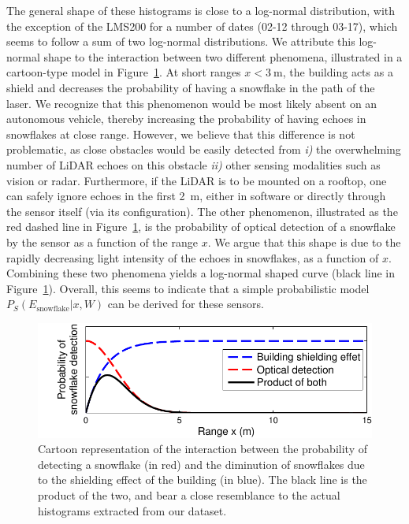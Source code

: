 The general shape of these histograms is close to a log-normal distribution, with the exception of the LMS200 for a number of dates (02-12 through 03-17), which seems to follow a sum of two log-normal distributions. We attribute this log-normal shape to the interaction between two different phenomena, illustrated in a cartoon-type model in Figure~\ref{fig:CartoonModel}. At short ranges $x<\SI{3}{\meter}$, the building acts as a shield and decreases the probability of having a snowflake in the path of the laser. We recognize that this phenomenon would be most likely absent on an autonomous vehicle, thereby increasing the probability of having echoes in snowflakes at close range. However, we believe that this difference is not problematic, as close obstacles would be easily detected from \emph{i)} the overwhelming number of  LiDAR echoes on this obstacle \emph{ii)} other sensing modalities such as vision or radar. Furthermore, if the LiDAR is to be mounted on a rooftop, one can safely  ignore echoes in the first \SI{2}{\meter}, either in software or directly through the sensor itself (via its configuration). The other phenomenon, illustrated as the red dashed line in Figure~\ref{fig:CartoonModel}, is the probability of optical detection of a snowflake by the sensor as a function of the range $x$. We argue that this shape is due to the rapidly decreasing light intensity of the echoes in snowflakes, as a function of $x$. Combining these two phenomena yields a log-normal shaped curve (black line in Figure~\ref{fig:CartoonModel}). Overall, this seems to indicate that a simple probabilistic model $P_S(E_\text{snowflake}|x,W)$ can be derived for these sensors.

\begin{figure}
    \centering
    \includegraphics[trim={0.6cm 0 0 0},clip,width=0.7\linewidth]{./img/chap_lidar/ShieldingModel.pdf}
    \caption[Cartoon representation of the interaction between the probability of detecting a snowflake and the diminution of snowflakes due to the shielding effect of the building.]{Cartoon representation of the interaction between the probability of detecting a snowflake (in red) and the diminution of snowflakes due to the shielding effect of the building (in blue). The black line is the product of the two, and bear a close resemblance to the actual histograms extracted from our dataset.}
    \label{fig:CartoonModel}
\end{figure}


